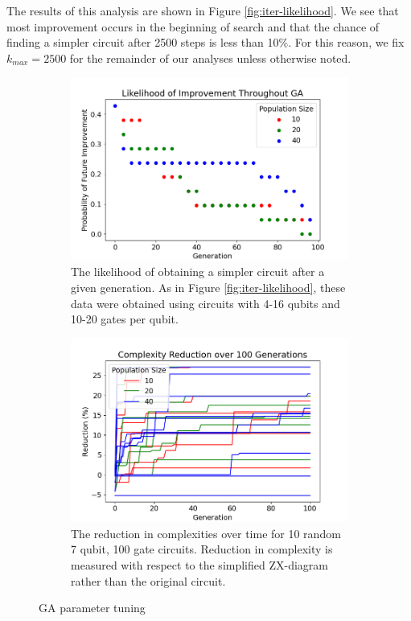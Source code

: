 The results of this analysis are shown in Figure \ref{fig:iter-likelihood}.
We see that most improvement occurs in the beginning of search and that the chance of finding a simpler circuit after 2500 steps is less than 10\%.
For this reason, we fix $k_{max} = 2500$ for the remainder of our analyses unless otherwise noted.


\begin{figure}
\centering
\begin{subfigure}[t]{0.47\textwidth}
  \centering
  \includegraphics[width=\linewidth]{img/ga-likelihood.png}
  \caption{
    The likelihood of obtaining a simpler circuit after a given generation.
    As in Figure \ref{fig:iter-likelihood}, these data were obtained using circuits with 4-16 qubits and 10-20 gates per qubit.}
  \label{fig:ga-likelihood}
\end{subfigure}
\hfill
\begin{subfigure}[t]{0.47\textwidth}
  \centering
  \includegraphics[width=\linewidth]{img/7qb}
  \caption{
    The reduction in complexities over time for 10 random 7 qubit, 100 gate circuits.
    Reduction in complexity is measured with respect to the simplified ZX-diagram rather than the original circuit.
  }
  \label{fig:7qb}
\end{subfigure}
\caption{
  GA parameter tuning
}
\label{fig:ga-params}
\end{figure}


